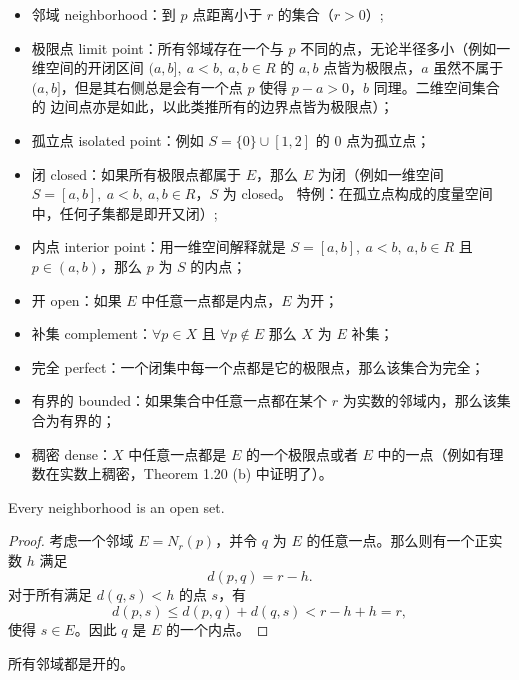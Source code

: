 \documentclass[../poma-notes.tex]{subfiles}
\begin{document}
\begin{anote}
  \begin{itemize}
    \item 邻域 neighborhood：到 $p$ 点距离小于 $r$ 的集合（$r>0$）;
    \item 极限点 limit point：所有邻域存在一个与 $p$ 不同的点，无论半径多小（例如一维空间的开闭区间 $(a,b],\ a<b, \ a,b \in R$
          的 $a,b$ 点皆为极限点，$a$ 虽然不属于 $(a,b]$，但是其右侧总是会有一个点 $p$ 使得 $p-a>0$，$b$ 同理。二维空间集合的
          边间点亦是如此，以此类推所有的边界点皆为极限点）；
    \item 孤立点 isolated point：例如 $S = \{0\} \cup [1,2]$ 的 0 点为孤立点；
    \item 闭 closed：如果所有极限点都属于 $E$，那么 $E$ 为闭（例如一维空间 $S=[a,b],\ a<b, \ a,b \in R$，$S$ 为 closed。
          特例：在孤立点构成的度量空间中，任何子集都是即开又闭）;
    \item 内点 interior point：用一维空间解释就是 $S=[a,b],\ a<b,\ a,b \in R$ 且 $p \in (a,b)$，那么 $p$ 为 $S$ 的内点；
    \item 开 open：如果 $E$ 中任意一点都是内点，$E$ 为开；
    \item 补集 complement：$\forall p \in X$ 且 $\forall p \notin E$ 那么 $X$ 为 $E$ 补集；
    \item 完全 perfect：一个闭集中每一个点都是它的极限点，那么该集合为完全；
    \item 有界的 bounded：如果集合中任意一点都在某个 $r$ 为实数的邻域内，那么该集合为有界的；
    \item 稠密 dense：$X$ 中任意一点都是 $E$ 的一个极限点或者 $E$ 中的一点（例如有理数在实数上稠密，Theorem 1.20 (b) 中证明了）。
  \end{itemize}
\end{anote}

\begin{theorem}
  Every neighborhood is an open set.
\end{theorem}

\begin{proof}
  考虑一个邻域 $E = N_r(p)$，并令 $q$ 为 $E$ 的任意一点。那么则有一个正实数 $h$ 满足
  \[d(p,q)=r-h.\]
  对于所有满足 $d(q,s)<h$ 的点 $s$，有
  \[d(p,s) \le d(p,q) + d(q,s) < r - h + h = r,\]
  使得 $s \in E$。因此 $q$ 是 $E$ 的一个内点。
\end{proof}

\begin{anote}
  所有邻域都是开的。
\end{anote}
\end{document}
